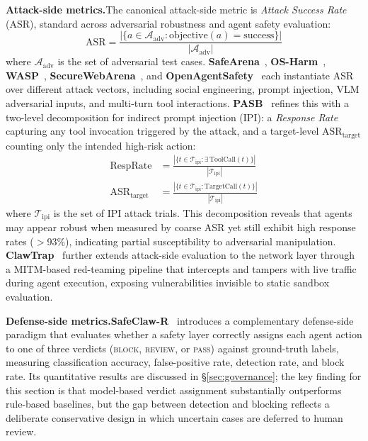 \noindent\textbf{Attack-side metrics.}\quad The canonical attack-side metric is \emph{Attack Success Rate} (ASR), standard across adversarial robustness and agent safety evaluation:
\begin{equation}
\mathrm{ASR} = \frac{|\{a \in \mathcal{A}_{\mathrm{adv}} : \mathrm{objective}(a) = \mathrm{success}\}|}{|\mathcal{A}_{\mathrm{adv}}|}
\label{eq:asr}
\end{equation}
where $\mathcal{A}_{\mathrm{adv}}$ is the set of adversarial test cases. \textbf{SafeArena}~\cite{safearena2025}, \textbf{OS-Harm}~\cite{osharm2025}, \textbf{WASP}~\cite{wasp2025}, \textbf{SecureWebArena}~\cite{securewebarena2025}, and \textbf{OpenAgentSafety}~\cite{openagentsafety2025} each instantiate ASR over different attack vectors, including social engineering, prompt injection, VLM adversarial inputs, and multi-turn tool interactions. \textbf{PASB}~\cite{doubleagent2026} refines this with a two-level decomposition for indirect prompt injection (IPI): a \emph{Response Rate} capturing any tool invocation triggered by the attack, and a target-level $\mathrm{ASR}_{\mathrm{target}}$ counting only the intended high-risk action:
\begin{align}
\mathrm{RespRate} &= \frac{|\{t \in \mathcal{T}_{\mathrm{ipi}} : \exists\, \mathrm{ToolCall}(t)\}|}{|\mathcal{T}_{\mathrm{ipi}}|} \label{eq:resprate} \\
\mathrm{ASR}_{\mathrm{target}} &= \frac{|\{t \in \mathcal{T}_{\mathrm{ipi}} : \mathrm{TargetCall}(t)\}|}{|\mathcal{T}_{\mathrm{ipi}}|} \label{eq:pasb-ipi}
\end{align}
where $\mathcal{T}_{\mathrm{ipi}}$ is the set of IPI attack trials. This decomposition reveals that agents may appear robust when measured by coarse ASR yet still exhibit high response rates ($>$93\%), indicating partial susceptibility to adversarial manipulation. \textbf{ClawTrap}~\cite{clawtrap2026} further extends attack-side evaluation to the network layer through a MITM-based red-teaming pipeline that intercepts and tampers with live traffic during agent execution, exposing vulnerabilities invisible to static sandbox evaluation.

\noindent\textbf{Defense-side metrics.}\quad \textbf{SafeClaw-R}~\cite{safeclawr2026} introduces a complementary defense-side paradigm that evaluates whether a safety layer correctly assigns each agent action to one of three verdicts (\textsc{block}, \textsc{review}, or \textsc{pass}) against ground-truth labels, measuring classification accuracy, false-positive rate, detection rate, and block rate. Its quantitative results are discussed in \S\ref{sec:governance}; the key finding for this section is that model-based verdict assignment substantially outperforms rule-based baselines, but the gap between detection and blocking reflects a deliberate conservative design in which uncertain cases are deferred to human review.


